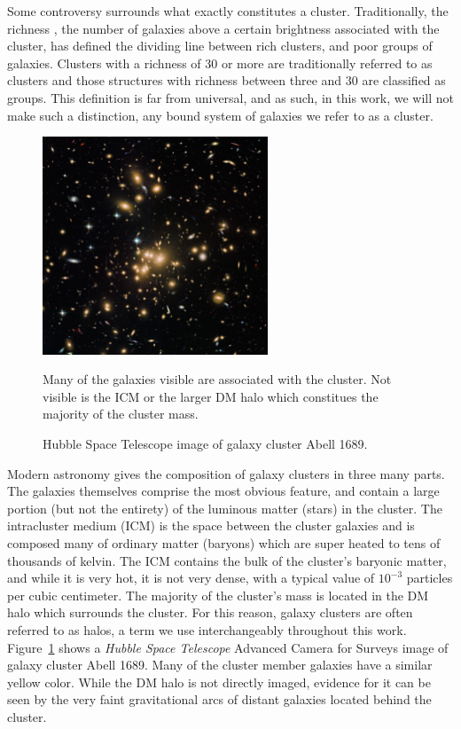 Some controversy surrounds what exactly constitutes a cluster. Traditionally, the richness \citep{Abell1958}, the number of galaxies above a certain brightness associated with the cluster, has defined the dividing line between rich clusters, and poor groups of galaxies. Clusters with a richness of 30 or more are traditionally referred to as clusters and those structures with richness between three and 30 are classified as groups. This definition is far from universal, and as such, in this work, we will not make such a distinction, any bound system of galaxies we refer to as a cluster.

\begin{figure}[ht]
	\begin{center}
		\includegraphics[width=0.6\textwidth]{figures/abell1689_hubble.pdf} 
	\end{center}
	\singlespace
	\caption{Hubble Space Telescope image of galaxy cluster Abell 1689.} Many of the galaxies visible are associated with the cluster. Not visible is the ICM or the larger DM halo which constitues the majority of the cluster mass.
	\label{fig: abell1689_hubble} 
\end{figure}

Modern astronomy gives the composition of galaxy clusters in three many parts. The galaxies themselves comprise the most obvious feature, and contain a large portion (but not the entirety) of the luminous matter (stars) in the cluster. The intracluster medium (ICM) is the space between the cluster galaxies and is composed many of ordinary matter (baryons) which are super heated to tens of thousands of kelvin. The ICM contains the bulk of the cluster's baryonic matter, and while it is very hot, it is not very dense, with a typical value of $10^{-3}$ particles per cubic centimeter. The majority of the cluster's mass is located in the DM halo which surrounds the cluster. For this reason, galaxy clusters are often referred to as halos, a term we use interchangeably throughout this work. Figure~\ref{fig: abell1689_hubble} shows a \emph{Hubble Space Telescope} Advanced Camera for Surveys image of galaxy cluster Abell 1689. Many of the cluster member galaxies have a similar yellow color. While the DM halo is not directly imaged, evidence for it can be seen by the very faint gravitational arcs of distant galaxies located behind the cluster.

